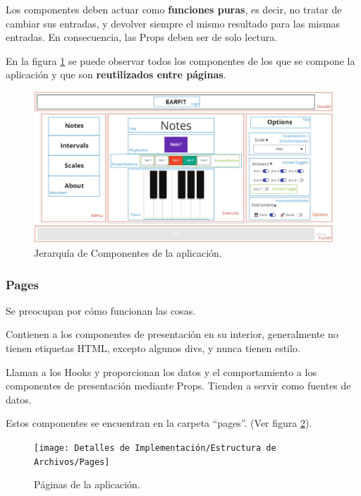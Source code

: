 \documentclass[12pt,twoside,titlepage]{report}
\begin{document}
Los componentes deben actuar como \textbf{funciones puras}, es decir, no tratar de cambiar sus entradas, y devolver siempre el mismo resultado para las mismas entradas. En consecuencia, las Props deben ser de solo lectura. 

En la figura \ref{fig:JerarquiaComponentes} se puede observar todos los componentes de los que se compone la aplicación y que son \textbf{reutilizados entre páginas}.

\begin{figure}[H]
    \centering
    \includegraphics[scale=0.28]{Detalles de Implementación/JerarquíaComponentes}
    \caption{Jerarquía de Componentes de la aplicación.}
    \label{fig:JerarquiaComponentes}
\end{figure}

\subsubsection{Pages}

\begin{compactitem}
    \item Se preocupan por cómo funcionan las cosas.
    \item Contienen a los componentes de presentación en su interior, generalmente no tienen etiquetas HTML, excepto algunos divs, y nunca tienen estilo.
    \item Llaman a los Hooks y proporcionan los datos y el comportamiento a los componentes de presentación mediante Props. Tienden a servir como fuentes de datos.
    \item Estos componentes se encuentran en la carpeta ``pages''. (Ver figura \ref{fig:Pages}).
\end{compactitem}

\begin{figure}[H]
    \centering
    \texttt{[image: Detalles de Implementación/Estructura de Archivos/Pages]}
    \caption{Páginas de la aplicación.}
    \label{fig:Pages}
\end{figure}
\end{document}
